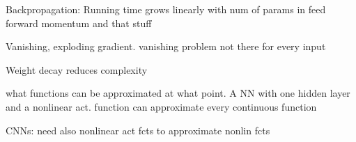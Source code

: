 Backpropagation: Running time grows linearly with num of params in feed forward
momentum and that stuff


Vanishing, exploding gradient. vanishing problem not there for every input

Weight decay reduces complexity

what functions can be approximated at what point. A NN with one hidden layer and a nonlinear act. function can approximate every continuous function

CNNs: need also nonlinear act fcts to approximate nonlin fcts






